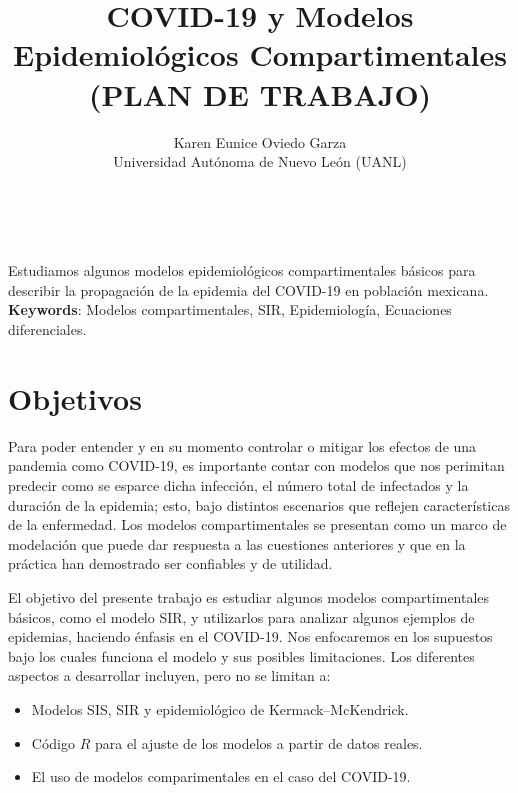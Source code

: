 \documentclass[11pt]{article}
\title{\textbf{COVID-19 y Modelos Epidemiológicos Compartimentales\\ (PLAN DE TRABAJO)}}
\author{Karen Eunice Oviedo Garza
\\Universidad Aut\'onoma de Nuevo Le\'on (UANL)}
\date{}
\begin{document}
	\maketitle

\begin{center}
\abstractname{}\\
\end{center}
Estudiamos algunos modelos epidemiológicos compartimentales básicos para describir la propagación de la
epidemia del COVID-19 en población mexicana.\\
\noindent \textbf{Keywords}: Modelos compartimentales, SIR, Epidemiología, Ecuaciones diferenciales.

\renewcommand\contentsname{Contenido}
\tableofcontents



\underline{\hspace{15cm}}


\section{Objetivos}  \label{Obj}

Para poder entender y en su momento controlar o mitigar los efectos
de una pandemia como COVID-19, es importante contar con modelos que nos perimitan 
predecir como se esparce dicha infección, el número total de infectados y
la duración de la epidemia; esto, bajo distintos escenarios que reflejen características de
la enfermedad. Los modelos compartimentales se presentan como un marco de modelación que puede dar
respuesta a las cuestiones anteriores y que en la práctica han demostrado ser confiables y de utilidad.


\medskip

El objetivo del presente trabajo es estudiar algunos modelos compartimentales básicos, como
el modelo SIR, y utilizarlos para analizar algunos ejemplos de epidemias, haciendo énfasis
en el COVID-19. Nos enfocaremos en los supuestos bajo los cuales funciona el modelo y sus 
posibles limitaciones. Los diferentes aspectos a desarrollar incluyen, pero no se limitan a:

\begin{itemize}
\item Modelos SIS, SIR y epidemiológico de Kermack–McKendrick.
\item C\'odigo $R$ para el ajuste de los modelos a partir de datos reales.
\item El uso de modelos comparimentales en el caso del COVID-19.
\end{itemize}
\end{document}
